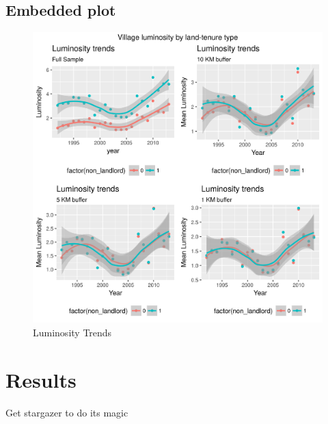 \documentclass[12pt,]{article}
\begin{document}
\newpage

\hypertarget{embedded-plot}{%
\subsection{Embedded plot}\label{embedded-plot}}

\begin{figure}
\centering
\includegraphics{luminosity_grid.png}
\caption{Luminosity Trends}
\end{figure}

\newpage

\hypertarget{results}{%
\section{Results}\label{results}}

Get stargazer to do its magic
\end{document}
